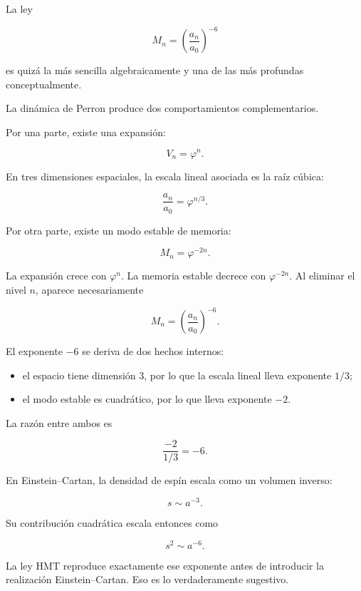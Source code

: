 La ley\par

\[
M_n
=
\left(\frac{a_n}{a_0}\right)^{-6}
\]

es quizá la más sencilla algebraicamente y una de las más profundas conceptualmente.\par

La dinámica de Perron produce dos comportamientos complementarios.\par

Por una parte, existe una expansión:\par

\[
V_n=\varphi^n.
\]

En tres dimensiones espaciales, la escala lineal asociada es la raíz cúbica:\par

\[
\frac{a_n}{a_0}
=
\varphi^{n/3}.
\]

Por otra parte, existe un modo estable de memoria:\par

\[
M_n=\varphi^{-2n}.
\]

La expansión crece con \(\varphi^n\). La memoria estable decrece con \(\varphi^{-2n}\). Al eliminar el nivel \(n\), aparece necesariamente\par

\[
M_n
=
\left(\frac{a_n}{a_0}\right)^{-6}.
\]

El exponente \(-6\) se deriva de dos hechos internos:\par

\begin{itemize}[leftmargin=*,itemsep=0.35em]
\item el espacio tiene dimensión \(3\), por lo que la escala lineal lleva exponente \(1/3\);
\item el modo estable es cuadrático, por lo que lleva exponente \(-2\).
\end{itemize}

La razón entre ambos es\par

\[
\frac{-2}{1/3}=-6.
\]

En Einstein–Cartan, la densidad de espín escala como un volumen inverso:\par

\[
s\sim a^{-3}.
\]

Su contribución cuadrática escala entonces como\par

\[
s^2\sim a^{-6}.
\]

La ley HMT reproduce exactamente ese exponente antes de introducir la realización Einstein–Cartan. Eso es lo verdaderamente sugestivo.\par

